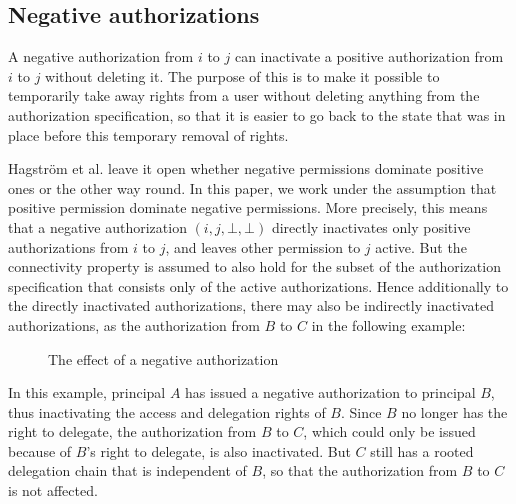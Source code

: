 \documentclass[runningheads]{llncs}
\begin{document}
\subsection{Negative authorizations}
\label{negative}

A negative authorization from $i$ to $j$ can inactivate a positive authorization from $i$ to $j$ without deleting it. The purpose of this is to make it possible to temporarily take away rights from a user without deleting anything from the authorization specification, so that it is easier to go back to the state that was in place before this temporary removal of rights. 

Hagstr\"om et al. \cite{Hagstrom} leave it open whether negative permissions dominate positive ones or the other way round. In this paper, we work under the assumption that positive permission dominate negative permissions.
More precisely, this means that a negative authorization $(i,j,\bot,\bot)$ directly inactivates only positive authorizations from $i$ to $j$, and leaves other permission to $j$ active. But the connectivity property is assumed to also hold for the subset of the authorization specification that consists only of the active authorizations. Hence additionally to the directly inactivated authorizations, there may also be indirectly inactivated authorizations, as the authorization from $B$ to $C$ in the following example:
\vspace{-3mm}
\begin{figure}[H]
\center
{}
\caption{The effect of a negative authorization}
\end{figure}
\vspace{-3mm}
In this example, principal $A$ has issued a negative authorization to principal $B$, thus inactivating the access and delegation rights of $B$. Since $B$ no longer has the right to delegate, the authorization from $B$ to $C$, which could only be issued because of $B$'s right to delegate, is also inactivated. But $C$ still has a rooted delegation chain that is independent of $B$, so that the authorization from $B$ to $C$ is not affected. 
\end{document}
